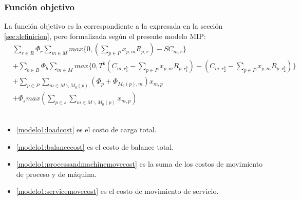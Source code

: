 \subsubsection{Función objetivo}
La función objetivo es la correspondiente a la expresada en la sección \ref{sec:definicion}, pero formalizada según el presente modelo MIP:\\
\begin{align}
	\label{modelo1:loadcost}& \sum_{r \in R}\Phi_{r}\sum_{m \in M}max \{ 0,(\sum_{p \in P}x_{p,m}R_{p,r}) - SC_{m,r} \} \\
	\label{modelo1:balancecost}&+ \sum_{b \in B}\Phi_{b}\sum_{m \in M}max\{0, T^b(C_{m,r_{1}^b} - \sum_{p \in P}x_{p,m}R_{p,r_{1}^b}) - (C_{m,r_{2}^b} - \sum_{p \in P}x_{p,m}R_{p,r_{2}^b})\} \\
	\label{modelo1:processandmachinemovecost}&+ \sum_{p \in P}\sum_{m \in M \backslash M_0(p)}(\Phi_{p} + \Phi_{M_0(p),m})x_{m,p} \\
	\label{modelo1:servicemovecost}&+ \Phi_{s}max(\sum_{p \in s}\sum_{m \in M \backslash M_0(p)}x_{m,p})
\end{align}
\\
\begin{itemize}
	\item \eqref{modelo1:loadcost} es el costo de carga total.
	\item \eqref{modelo1:balancecost} es el costo de balance total.
	\item \eqref{modelo1:processandmachinemovecost} es la suma de los costos de movimiento de proceso y de máquina.
	\item \eqref{modelo1:servicemovecost} es el costo de movimiento de servicio.
\end{itemize}


